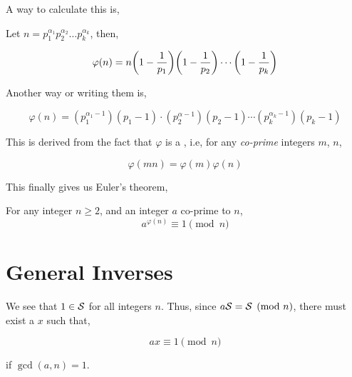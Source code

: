 A way to calculate this is, 

\begin{theorem}
    Let \(n = p_1^{\alpha_1}p_2^{\alpha_2}\dots p_k^{\alpha_k}\), then,

    \begin{equation}
        \varphi(n) = n\qty(1 - \frac{1}{p_1})\qty(1 - \frac{1}{p_2})\cdots\qty(1 - \frac{1}{p_k})
    \end{equation} 
\end{theorem}

Another way or writing them is, 

\begin{equation}
    \varphi(n) = (p_1^{\alpha_1 - 1})(p_1-1) \cdot (p_2^{\alpha - 1})(p_2 - 1) \cdots (p_k^{\alpha_k - 1})(p_k - 1)
\end{equation}

This is derived from the fact that \(\varphi\) is a , i.e, for any 
\emph{co-prime} integers \(m\), \(n\),

\begin{equation}
    \varphi(mn) = \varphi(m)\varphi(n)
\end{equation}

This finally gives us Euler's theorem, 

\begin{theorem}
    For any integer \(n \ge 2\), and an integer \(a\) co-prime to \(n\), 
    \begin{equation}
        a^{\varphi(n)} \equiv 1 \pmod{n}
    \end{equation}
\end{theorem}

\section{General Inverses}

We see that \(1 \in \mathcal{S}\) for all integers \(n\). Thus, 
since \(a\mathcal{S} = \mathcal{S} \pmod{n}\), there must exist a \(x\) such that, 

\begin{equation*}
    ax \equiv 1 \pmod{n}
\end{equation*}

if \(\gcd(a, n) = 1\).
